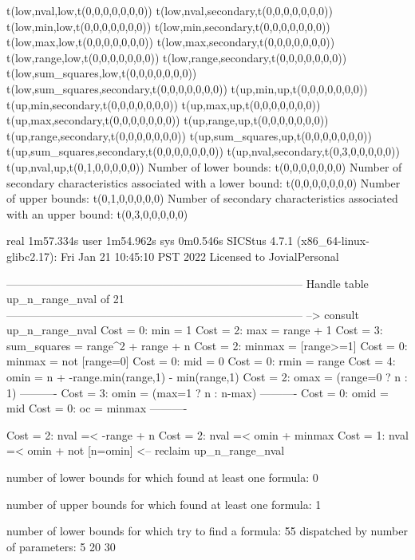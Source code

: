 t(low,nval,low,t(0,0,0,0,0,0,0))
t(low,nval,secondary,t(0,0,0,0,0,0,0))
t(low,min,low,t(0,0,0,0,0,0,0))
t(low,min,secondary,t(0,0,0,0,0,0,0))
t(low,max,low,t(0,0,0,0,0,0,0))
t(low,max,secondary,t(0,0,0,0,0,0,0))
t(low,range,low,t(0,0,0,0,0,0,0))
t(low,range,secondary,t(0,0,0,0,0,0,0))
t(low,sum_squares,low,t(0,0,0,0,0,0,0))
t(low,sum_squares,secondary,t(0,0,0,0,0,0,0))
t(up,min,up,t(0,0,0,0,0,0,0))
t(up,min,secondary,t(0,0,0,0,0,0,0))
t(up,max,up,t(0,0,0,0,0,0,0))
t(up,max,secondary,t(0,0,0,0,0,0,0))
t(up,range,up,t(0,0,0,0,0,0,0))
t(up,range,secondary,t(0,0,0,0,0,0,0))
t(up,sum_squares,up,t(0,0,0,0,0,0,0))
t(up,sum_squares,secondary,t(0,0,0,0,0,0,0))
t(up,nval,secondary,t(0,3,0,0,0,0,0))
t(up,nval,up,t(0,1,0,0,0,0,0))
Number of lower bounds:                                             t(0,0,0,0,0,0,0)
Number of secondary characteristics associated with a lower bound:  t(0,0,0,0,0,0,0)
Number of upper bounds:                                             t(0,1,0,0,0,0,0)
Number of secondary characteristics associated with an upper bound: t(0,3,0,0,0,0,0)

real	1m57.334s
user	1m54.962s
sys	0m0.546s
SICStus 4.7.1 (x86_64-linux-glibc2.17): Fri Jan 21 10:45:10 PST 2022
Licensed to JovialPersonal


--------------------------------------------------------------------------------
Handle table up_n_range_nval of 21
--------------------------------------------------------------------------------
--> consult up_n_range_nval
Cost =  0:  min         = 1
Cost =  2:  max         = range + 1
Cost =  3:  sum_squares = range^2 + range + n
Cost =  2:  minmax      = [range>=1]
Cost =  0:  minmax      = not [range=0]
Cost =  0:  mid         = 0
Cost =  0:  rmin        = range
Cost =  4:  omin        = n + -range.min(range,1) - min(range,1) %
Cost =  2:  omax        = (range=0 ? n : 1)
----------
Cost =  3:  omin        = (max=1 ? n : n-max)
----------
Cost =  0:  omid        = mid
Cost =  0:  oc          = minmax
----------

Cost =  2:  nval =< -range + n
Cost =  2:  nval =< omin + minmax
Cost =  1:  nval =< omin + not [n=omin] %
<-- reclaim up_n_range_nval

number of lower bounds for which found at least one formula: 0

number of upper bounds for which found at least one formula: 1

number of lower bounds for which try to find a formula: 55
dispatched by number of parameters: 5  20  30

